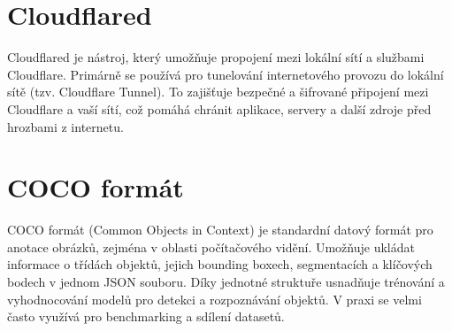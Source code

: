 
\section{Cloudflared}\label{sec:cloudflared}
Cloudflared je nástroj, který umožňuje propojení mezi lokální sítí a službami Cloudflare.
Primárně se používá pro tunelování internetového provozu do lokální sítě (tzv. Cloudflare Tunnel).
To zajišťuje bezpečné a šifrované připojení mezi Cloudflare a vaší sítí, což pomáhá chránit aplikace, servery a další zdroje před hrozbami z internetu.

\section{COCO formát}\label{sec:coco_format}
COCO formát (Common Objects in Context) je standardní datový formát pro anotace obrázků, zejména v oblasti počítačového vidění.
Umožňuje ukládat informace o třídách objektů, jejich bounding boxech, segmentacích a klíčových bodech v jednom JSON souboru.
Díky jednotné struktuře usnadňuje trénování a vyhodnocování modelů pro detekci a rozpoznávání objektů.
V praxi se velmi často využívá pro benchmarking a sdílení datasetů.